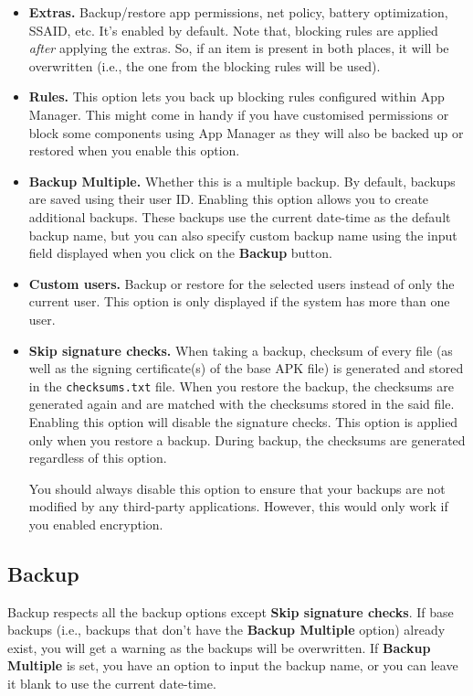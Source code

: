 \begin{itemize}
    \item \textbf{Extras.} Backup/restore app permissions, net policy, battery optimization, SSAID, etc. It's enabled
    by default. Note that, blocking rules are applied \textit{after} applying the extras. So, if an item is present in
    both places, it will be overwritten (i.e., the one from the blocking rules will be used).

    \item \textbf{Rules.} This option lets you back up blocking rules configured within App Manager. This might come in
    handy if you have customised permissions or block some components using App Manager as they will also be backed up
    or restored when you enable this option.

    \item \textbf{Backup Multiple.} Whether this is a multiple backup. By default, backups are saved using their user
    ID. Enabling this option allows you to create additional backups. These backups use the current date-time as the
    default backup name, but you can also specify custom backup name using the input field displayed when you click on
    the \textbf{Backup} button.

    \item \textbf{Custom users.} Backup or restore for the selected users instead of only the current user. This option
    is only displayed if the system has more than one user.

    \item \textbf{Skip signature checks.} When taking a backup, checksum of every file (as well as the signing
    certificate(s) of the base APK file) is generated and stored in the \texttt{checksums.txt} file. When you restore
    the backup, the checksums are generated again and are matched with the checksums stored in the said file. Enabling
    this option will disable the signature checks. This option is applied only when you restore a backup. During backup,
    the checksums are generated regardless of this option.
    \begin{warning}[Caution]
        You should always disable this option to ensure that your backups are not modified by any third-party
        applications. However, this would only work if you enabled encryption.
    \end{warning}
\end{itemize}

\subsection{Backup}\label{subsec:backup-restore-backup}
Backup respects all the backup options except \textbf{Skip signature checks}. If base backups (i.e., backups that don't
have the \textbf{Backup Multiple} option) already exist, you will get a warning as the backups will be overwritten. If
\textbf{Backup Multiple} is set, you have an option to input the backup name, or you can leave it blank to use the
current date-time.

